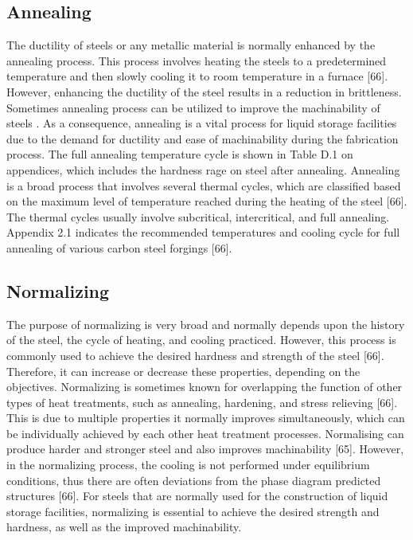 \documentclass[12pt]{report}
\begin{document}
\subsection{Annealing}
The ductility of steels or any metallic material is normally enhanced by the annealing process. This process involves heating the steels to a predetermined temperature and then slowly cooling it to room temperature in a furnace [66]. However, enhancing the ductility of the steel results in a reduction in brittleness. Sometimes annealing process can be utilized to improve the machinability of steels \cite{nikkhah2019improved}. As a consequence, annealing is a vital process for liquid storage facilities due to the demand for ductility and ease of machinability during the fabrication process. The full annealing temperature cycle is shown in Table D.1 on appendices, which includes the hardness rage on steel after annealing. 
Annealing is a broad process that involves several thermal cycles, which are classified based on the maximum level of temperature reached during the heating of the steel [66]. The thermal cycles usually involve subcritical, intercritical, and full annealing. Appendix 2.1 indicates the recommended temperatures and cooling cycle for full annealing of various carbon steel forgings [66]. 

\subsection{Normalizing}
The purpose of normalizing is very broad and normally depends upon the history of the steel, the cycle of heating, and cooling practiced. However, this process is commonly used to achieve the desired hardness and strength of the steel [66]. Therefore, it can increase or decrease these properties, depending on the objectives. 
Normalizing is sometimes known for overlapping the function of other types of heat treatments, such as annealing, hardening, and stress relieving [66]. This is due to multiple properties it normally improves simultaneously, which can be individually achieved by each other heat treatment processes. Normalising can produce harder and stronger steel and also improves machinability [65]. However, in the normalizing process, the cooling is not performed under equilibrium conditions, thus there are often deviations from the phase diagram predicted structures [66].  For steels that are normally used for the construction of liquid storage facilities, normalizing is essential to achieve the desired strength and hardness, as well as the improved machinability.
\end{document}
